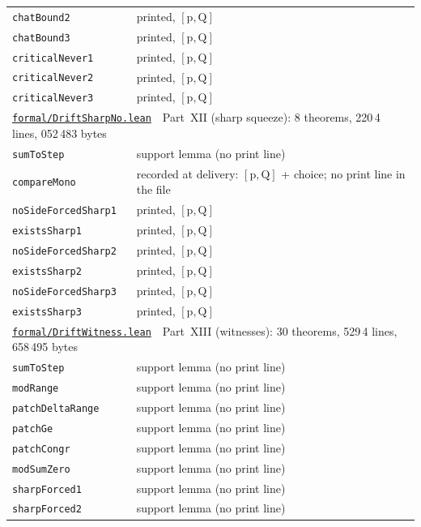 \documentclass[11pt]{article}
\theoremstyle{plain}
\theoremstyle{definition}
\begin{document}
\begin{longtable}{p{} p{}}
\quad\texttt{chatBound2} & printed, $[\mathrm{p},\mathrm{Q}]$\\
\quad\texttt{chatBound3} & printed, $[\mathrm{p},\mathrm{Q}]$\\
\quad\texttt{criticalNever1} & printed, $[\mathrm{p},\mathrm{Q}]$\\
\quad\texttt{criticalNever2} & printed, $[\mathrm{p},\mathrm{Q}]$\\
\quad\texttt{criticalNever3} & printed, $[\mathrm{p},\mathrm{Q}]$\\
\hline
\multicolumn{2}{l}{\hyperref[sec:squeeze]{\texttt{formal/DriftSharpNo.lean}}\ \ Part~XII (sharp squeeze): 8 theorems, 220\,4 lines, 052\,483 bytes}\\
\quad\texttt{sumToStep} & support lemma (no print line)\\
\quad\texttt{compareMono} & recorded at delivery: $[\mathrm{p},\mathrm{Q}]$ + choice; no print line in the file\\
\quad\texttt{noSideForcedSharp1} & printed, $[\mathrm{p},\mathrm{Q}]$\\
\quad\texttt{existsSharp1} & printed, $[\mathrm{p},\mathrm{Q}]$\\
\quad\texttt{noSideForcedSharp2} & printed, $[\mathrm{p},\mathrm{Q}]$\\
\quad\texttt{existsSharp2} & printed, $[\mathrm{p},\mathrm{Q}]$\\
\quad\texttt{noSideForcedSharp3} & printed, $[\mathrm{p},\mathrm{Q}]$\\
\quad\texttt{existsSharp3} & printed, $[\mathrm{p},\mathrm{Q}]$\\
\hline
\multicolumn{2}{l}{\hyperref[sec:witness]{\texttt{formal/DriftWitness.lean}}\ \ Part~XIII (witnesses): 30 theorems, 529\,4 lines, 658\,495 bytes}\\
\quad\texttt{sumToStep} & support lemma (no print line)\\
\quad\texttt{modRange} & support lemma (no print line)\\
\quad\texttt{patchDeltaRange} & support lemma (no print line)\\
\quad\texttt{patchGe} & support lemma (no print line)\\
\quad\texttt{patchCongr} & support lemma (no print line)\\
\quad\texttt{modSumZero} & support lemma (no print line)\\
\quad\texttt{sharpForced1} & support lemma (no print line)\\
\quad\texttt{sharpForced2} & support lemma (no print line)\\

\end{longtable}
\end{document}
